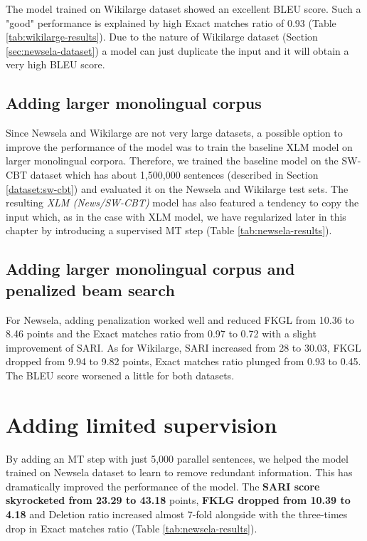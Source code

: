The model trained on Wikilarge dataset showed an excellent BLEU score. Such a "good" performance is explained by high Exact matches ratio of 0.93 (Table \ref{tab:wikilarge-results}). Due to the nature of Wikilarge dataset (Section \ref{sec:newsela-dataset}) a model can just duplicate the input and it will obtain a very high BLEU score.

\subsection{Adding larger monolingual corpus}

Since Newsela and Wikilarge are not very large datasets, a possible option to improve the performance of the model was to train the baseline XLM model on larger monolingual corpora. Therefore, we trained the baseline model on the SW-CBT dataset which has about 1,500,000 sentences (described in Section \ref{dataset:sw-cbt}) and evaluated it on the Newsela and Wikilarge test sets. The resulting \emph{XLM (News/SW-CBT)} model has also featured a tendency to copy the input which, as in the case with XLM model, we have regularized later in this chapter by introducing a supervised MT step (Table \ref{tab:newsela-results}). 

\subsection{Adding larger monolingual corpus and penalized beam search}

For Newsela, adding penalization worked well and reduced FKGL from 10.36 to 8.46 points and the Exact matches ratio from 0.97 to 0.72 with a slight improvement of SARI. As for Wikilarge, SARI increased from 28 to 30.03, FKGL dropped from 9.94 to 9.82 points, Exact matches ratio plunged from 0.93 to 0.45. The BLEU score worsened a little for both datasets.

\section{Adding limited supervision}

By adding an MT step with just 5,000 parallel sentences, we helped the model trained on Newsela dataset to learn to remove redundant information. This has dramatically improved the performance of the model. The \textbf{SARI score skyrocketed from 23.29 to 43.18} points, \textbf{FKLG dropped from 10.39 to 4.18} and Deletion ratio increased almost 7-fold alongside with the three-times drop in Exact matches ratio (Table \ref{tab:newsela-results}). 


